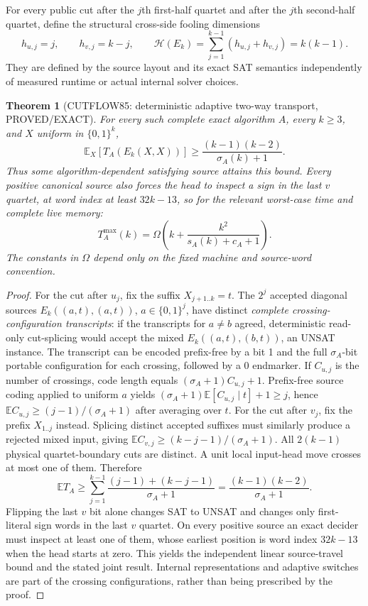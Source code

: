 \documentclass[11pt]{article}
\newtheorem{theorem}{Theorem}
\begin{document}
For every public cut after the $j$th first-half quartet and after the $j$th second-half quartet, define the structural cross-side fooling dimensions
\[
h_{u,j}=j,\qquad h_{v,j}=k-j,\qquad
\mathcal H(E_k)=\sum_{j=1}^{k-1}(h_{u,j}+h_{v,j})=k(k-1).
\]
They are defined by the source layout and its exact SAT semantics independently of measured runtime or actual internal solver choices.

\begin{theorem}[CUTFLOW85: deterministic adaptive two-way transport, PROVED/EXACT]
For every such complete exact algorithm $A$, every $k\ge3$, and $X$ uniform in $\{0,1\}^k$,
\[
\boxed{\mathbb E_X[T_A(E_k(X,X))]
\ge \frac{(k-1)(k-2)}{\sigma_A(k)+1}.}
\]
Thus some algorithm-dependent satisfying source attains this bound. Every positive canonical source also forces the head to inspect a sign in the last $v$ quartet, at word index at least $32k-13$, so for the relevant worst-case time and complete live memory:
\[
\boxed{T_A^{\max}(k)=
\Omega\!\left(k+\frac{k^2}{s_A(k)+c_A+1}\right).}
\]
The constants in $\Omega$ depend only on the fixed machine and source-word convention.
\end{theorem}
\begin{proof}
For the cut after $u_j$, fix the suffix $X_{j+1..k}=t$. The $2^j$ accepted diagonal sources
$E_k((a,t),(a,t))$, $a\in\{0,1\}^j$, have distinct \emph{complete crossing-configuration transcripts}:
if the transcripts for $a\ne b$ agreed, deterministic read-only cut-splicing would accept the mixed
$E_k((a,t),(b,t))$, an UNSAT instance. The transcript can be encoded prefix-free by a bit 1 and the full
$\sigma_A$-bit portable configuration for each crossing, followed by a 0 endmarker. If $C_{u,j}$ is the
number of crossings, code length equals $(\sigma_A+1)C_{u,j}+1$. Prefix-free source coding applied to
uniform $a$ yields $(\sigma_A+1)\mathbb E[C_{u,j}\mid t]+1\ge j$, hence
$\mathbb E C_{u,j}\ge(j-1)/(\sigma_A+1)$ after averaging over $t$.
For the cut after $v_j$, fix the prefix $X_{1..j}$ instead. Splicing distinct accepted suffixes
must similarly produce a rejected mixed input, giving
$\mathbb E C_{v,j}\ge(k-j-1)/(\sigma_A+1)$.
All $2(k-1)$ physical quartet-boundary cuts are distinct. A unit local input-head move crosses
at most one of them. Therefore
\[
\mathbb E T_A\ge\sum_{j=1}^{k-1}
\frac{(j-1)+(k-j-1)}{\sigma_A+1}
=\frac{(k-1)(k-2)}{\sigma_A+1}.
\]
Flipping the last $v$ bit alone changes SAT to UNSAT and changes only first-literal sign words in the
last $v$ quartet. On every positive source an exact decider must inspect at least one of them, whose
earliest position is word index $32k-13$ when the head starts at zero. This yields the independent
linear source-travel bound and the stated joint result. Internal representations and adaptive switches
are part of the crossing configurations, rather than being prescribed by the proof.
\end{proof}
\end{document}
